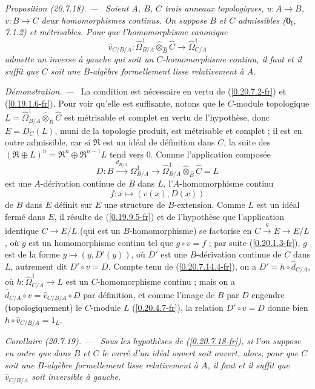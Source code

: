 \documentclass[10pt,oneside]{book}
\makeatletter
\newcommand{\sref}[1]{(\ref{#1})}
\newcommand{\setmanualcurrentlabel}[1]{\def\@currentlabel{#1}}
\newcommand{\oldpage}[2][]{%
  \setcounter{footnote}{0}%
  \marginpar{\scriptsize\textbf{#1}~|~#2}\ignorespaces}
\newenvironment{proposition}[1][]{%
  \setmanualcurrentlabel{#1}\par\medskip\noindent\itshape Proposition (#1). ---\ }{\par}
\newenvironment{corollary}[1][]{%
  \setmanualcurrentlabel{#1}\par\medskip\noindent\itshape Corollaire (#1). ---\ }{\par}
\newenvironment{proof}{%
  \par\medskip\noindent\textit{Démonstration. ---\ }}{\par}
\makeatother
\begin{document}
\begin{proposition}[20.7.18]
\label{0.20.7.18-fr}
Soient $A$, $B$, $C$ trois anneaux topologiques, $u:A\to B$, $v:B\to C$
deux homomorphismes continus. On suppose $B$ et $C$ admissibles
($\mathbf{0}_{\mathrm I}$, 7.1.2) et métrisables. Pour que l'homomorphisme
canonique
\[
  \widehat v_{C/B/A}:\widehat{\Omega}^1_{B/A}
  \widehat\otimes_{\widehat B}\widehat C\to\widehat{\Omega}^1_{C/A}
\]
admette un inverse à gauche qui soit un $C$-homomorphisme continu, il faut et
il suffit que $C$ soit une $B$-algèbre formellement lisse relativement à $A$.
\end{proposition}

\begin{proof}
La condition est nécessaire en vertu de \sref{0.20.7.2-fr} et
\sref{0.19.1.6-fr}. Pour voir qu'elle est suffisante, notons que le $C$-module
topologique
$L=\widehat{\Omega}^1_{B/A}\widehat\otimes_{\widehat B}\widehat C$ est
métrisable et
\oldpage[0\textsubscript{IV-1}]{153}
complet en vertu de l'hypothèse, donc $E=D_C(L)$, muni de la topologie produit,
est métrisable et complet ; il est en outre admissible, car si $\mathfrak{R}$
est un idéal de définition dans $C$, la suite des
$(\mathfrak{R}\oplus L)^n=\mathfrak{R}^n\oplus\mathfrak{R}^{n-1}L$ tend vers
$0$. Comme l'application composée
\[
  D:B\xrightarrow{d_{B/A}}\Omega^1_{B/A}\to
  \widehat{\Omega}^1_{B/A}\widehat\otimes_{\widehat B}\widehat C=L
\]
est une $A$-dérivation continue de $B$ dans $L$, l'$A$-homomorphisme continu
\[
  f:x\longmapsto(v(x),D(x))
\]
de $B$ dans $E$ définit sur $E$ une structure de $B$-extension. Comme $L$ est
un idéal fermé dans $E$, il résulte de \sref{0.19.9.5-fr} et de l'hypothèse
que l'application identique $C\to E/L$ (qui est un $B$-homomorphisme) se
factorise en $C\xrightarrow{g}E\to E/L$, où $g$ est un homomorphisme continu
tel que $g\circ v=f$ ; par suite \sref{0.20.1.3-fr}, $g$ est de la forme
$y\mapsto(y,D'(y))$, où $D'$ est une $B$-dérivation continue de $C$ dans $L$,
autrement dit $D'\circ v=D$. Compte tenu de \sref{0.20.7.14.4-fr}, on a
$D'=h\circ\widehat d_{C/A}$, où
$h:\widehat{\Omega}^1_{C/A}\to L$ est un $C$-homomorphisme continu ; mais on
a $\widehat d_{C/A}\circ v=\widehat v_{C/B/A}\circ D$ par définition, et
comme l'image de $B$ par $D$ engendre (topologiquement) le $C$-module $L$
\sref{0.20.4.7-fr}, la relation $D'\circ v=D$ donne bien
$h\circ\widehat v_{C/B/A}=1_L$.
\end{proof}

\begin{corollary}[20.7.19]
\label{0.20.7.19-fr}
Sous les hypothèses de \sref{0.20.7.18-fr}, si l'on suppose en outre que dans
$B$ et $C$ le carré d'un idéal ouvert soit ouvert, alors, pour que $C$ soit
une $B$-algèbre formellement lisse relativement à $A$, il faut et il suffit
que $\widehat v_{C/B/A}$ soit inversible à gauche.
\end{corollary}
\end{document}
